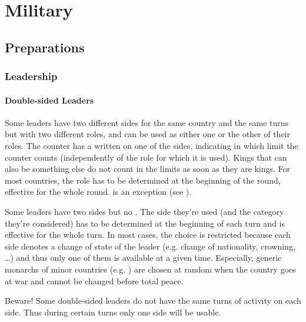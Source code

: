 \chapter{Military}\label{chapter:Military}

\section{Preparations}

\subsection{Leadership}\label{chMilitary:Leadership}
\subsubsection{Double-sided Leaders}\label{chMilitary:Double Sided Leaders}
\aparag Some leaders have two different sides for the same country and the
same turns but with two different roles, and can be used as either one or the
other of their roles.
\bparag The counter has a {\textetoile} written on one of the sides,
indicating in which limit the counter counts (independently of the role
for which it is used).
\bparag Kings that can also be something else do not count in the limits
as soon as they are kings.
\bparag For most countries, the role has to be determined at the
beginning of the round, effective for the whole round. \POR is an
exception (see ).

\aparag Some leaders have two sides but no {\textetoile}.
\bparag The side they're used (and the category they're considered) has
to be determined at the beginning of each turn and is effective for the
whole turn.
\bparag In most cases, the choice is restricted because each side
denotes a change of state of the leader (e.g. change of nationality,
crowning, \ldots) and thus only one of them is available at a given
time.
\bparag Especially, generic monarchs of minor countries
(e.g. \leaderShah) are chosen at random when the country goes at war and
cannot be changed before total peace.

\aparag Beware! Some double-sided leaders do not have the same turns of
activity on each side. Thus during certain turns only one side will be
usable.

